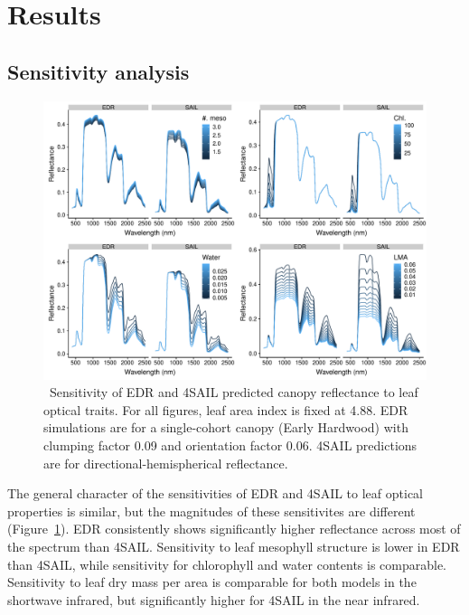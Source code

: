 \section{Results}

\subsection{Sensitivity analysis}

\begin{figure}
  \centering
  \includegraphics[width=\textwidth]{4_edr/figures/explore_spectra/edr_sensitivity_leaf_single.pdf}
  \caption{\
    Sensitivity of EDR and 4SAIL predicted canopy reflectance to leaf optical traits.
    For all figures, leaf area index is fixed at 4.88.
    EDR simulations are for a single-cohort canopy (Early Hardwood) with
    clumping factor 0.09 and orientation factor 0.06.
    4SAIL predictions are for directional-hemispherical reflectance.
  }\label{fig:sensitivity_leaf_single}
\end{figure}

The general character of the sensitivities of EDR and 4SAIL to leaf optical properties is similar,
but the magnitudes of these sensitivites are different (Figure~\ref{fig:sensitivity_leaf_single}).
EDR consistently shows significantly higher reflectance across most of the spectrum than 4SAIL\@.
Sensitivity to leaf mesophyll structure is lower in EDR than 4SAIL, while sensitivity for chlorophyll and water contents is comparable.
Sensitivity to leaf dry mass per area is comparable for both models in the shortwave infrared, but significantly higher for 4SAIL in the near infrared.

